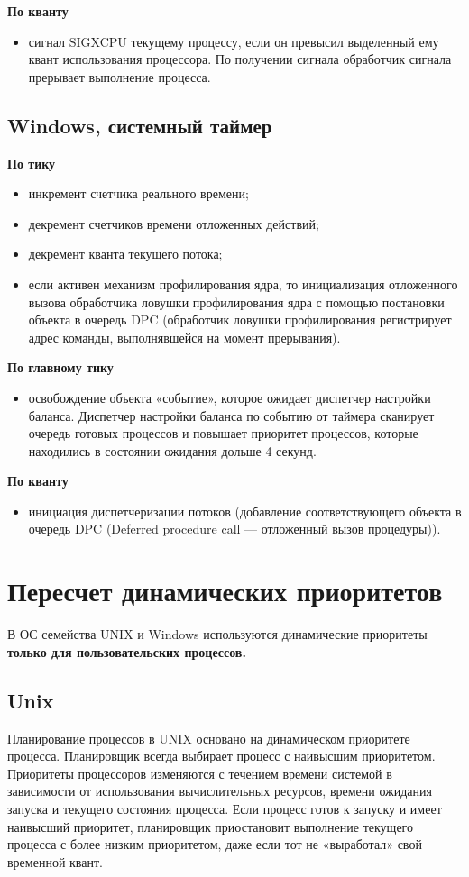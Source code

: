 \documentclass[a4paper,14pt,russian]{extreport}
\begin{document}
	\textbf{По кванту}
	\begin{itemize}
		\item  сигнал SIGXCPU текущему процессу, если он превысил выделенный ему квант использования процессора. По получении сигнала обработчик сигнала прерывает выполнение процесса.
	\end{itemize}

	\section{Windows, системный таймер}
	
	\textbf{По тику}
	\begin{itemize}
    	\item инкремент счетчика реального времени;
    	\item декремент счетчиков времени отложенных действий;
    	\item декремент кванта текущего потока;
    	\item если активен механизм профилирования ядра, то инициализация отложенного вызова обработчика ловушки профилирования ядра с помощью постановки объекта в очередь DPC (обработчик ловушки профилирования регистрирует адрес команды, выполнявшейся на момент прерывания).
	\end{itemize}

	\textbf{По главному тику}
	\begin{itemize}
		\item освобождение объекта «событие», которое ожидает диспетчер настройки баланса. Диспетчер настройки баланса по событию от таймера сканирует очередь готовых процессов и повышает приоритет процессов, которые находились в состоянии ожидания дольше 4 секунд.
	\end{itemize}

	\textbf{По кванту}
	\begin{itemize}
		\item инициация диспетчеризации потоков (добавление соответствующего объекта в очередь DPC (Deferred procedure call — отложенный вызов процедуры)).
	\end{itemize}

	\chapter{Пересчет динамических приоритетов}
	В ОС семейства UNIX и Windows используются динамические приоритеты \textbf{только для пользовательских процессов.}
	
	\section{Unix}
	Планирование процессов в UNIX основано на динамическом приоритете процесса.
	Планировщик всегда выбирает процесс с наивысшим приоритетом.
	Приоритеты процессоров изменяются с течением времени системой в зависимости от использования вычислительных ресурсов, времени ожидания запуска и текущего состояния процесса.
	Если процесс готов к запуску и имеет наивысший приоритет, планировщик приостановит выполнение текущего процесса с более низким приоритетом, даже если тот не «выработал» свой временной квант.
	
\end{document}
